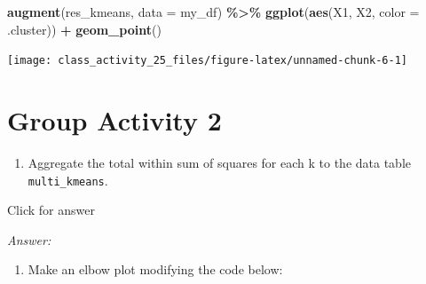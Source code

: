 \documentclass[
]{book}
\newenvironment{Shaded}{\begin{snugshade}}{\end{snugshade}}
\newcommand{\AttributeTok}[1]{\textcolor[rgb]{0.13,0.29,0.53}{#1}}
\newcommand{\DecValTok}[1]{\textcolor[rgb]{0.00,0.00,0.81}{#1}}
\newcommand{\FunctionTok}[1]{\textcolor[rgb]{0.13,0.29,0.53}{\textbf{#1}}}
\newcommand{\NormalTok}[1]{#1}
\newcommand{\OtherTok}[1]{\textcolor[rgb]{0.56,0.35,0.01}{#1}}
\newcommand{\SpecialCharTok}[1]{\textcolor[rgb]{0.81,0.36,0.00}{\textbf{#1}}}
\providecommand{\tightlist}{%
  \setlength{\itemsep}{0pt}\setlength{\parskip}{0pt}}
\begin{document}
\begin{Shaded}
\begin{Highlighting}[]
\FunctionTok{augment}\NormalTok{(res\_kmeans, }\AttributeTok{data =}\NormalTok{ my\_df) }\SpecialCharTok{\%\textgreater{}\%}
  \FunctionTok{ggplot}\NormalTok{(}\FunctionTok{aes}\NormalTok{(X1, X2, }\AttributeTok{color =}\NormalTok{ .cluster)) }\SpecialCharTok{+}
  \FunctionTok{geom\_point}\NormalTok{()}
\end{Highlighting}
\end{Shaded}

\texttt{[image: class\_activity\_25\_files/figure-latex/unnamed-chunk-6-1]}

\hypertarget{group-activity-2-9}{%
\section{Group Activity 2}\label{group-activity-2-9}}

\begin{enumerate}
\def\labelenumi{\alph{enumi}.}
\tightlist
\item
  Aggregate the total within sum of squares for each k to the data table \texttt{multi\_kmeans}.
\end{enumerate}

Click for answer

\emph{Answer:}

\begin{Shaded}
\end{Shaded}

\begin{enumerate}
\def\labelenumi{\alph{enumi}.}
\setcounter{enumi}{1}
\tightlist
\item
  Make an elbow plot modifying the code below:
\end{enumerate}
\end{document}
